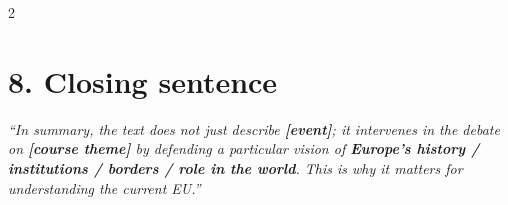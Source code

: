 \documentclass[10pt,a4paper]{article}
\begin{document}
\begin{multicols}{2}
\section*{\color{eublue}8. Closing sentence}
\emph{``In summary, the text does not just describe \textbf{[event]}; it intervenes in the debate on \textbf{[course theme]} by defending a particular vision of \textbf{Europe’s history / institutions / borders / role in the world}. This is why it matters for understanding the current EU.''}

\end{multicols}
\end{document}
